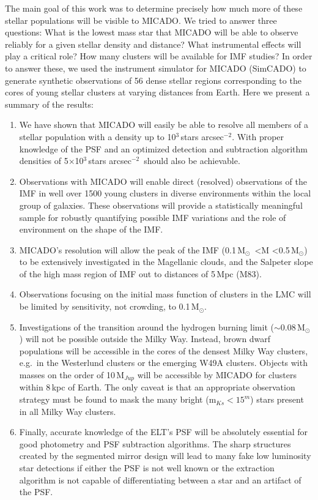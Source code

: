 \documentclass[referee]{aa}
\newcommand{\msun}{M$_\odot$~}
\newcommand{\msune}{M$_\odot$}
\newcommand{\s}{$\sim$}
\newcommand{\h}[1]{$^{#1}$}
\newcommand{\spa}{stars arcsec$^{-2}$~}
\newcommand{\spae}{stars arcsec$^{-2}$}
\begin{document}
The main goal of this work was to determine precisely how much more of these stellar populations will be visible to MICADO. We tried to answer three questions:
What is the lowest mass star that MICADO will be able to observe reliably for a given stellar density and distance?
What instrumental effects will play a critical role?
How many clusters will be available for IMF studies?
In order to answer these, we used the instrument simulator for MICADO (SimCADO) to generate synthetic observations of 56 dense stellar regions corresponding to the cores of young stellar clusters at varying distances from Earth.
Here we present a summary of the results:

\begin{enumerate}
    \item We have shown that MICADO will easily be able to resolve all members of a stellar population with a density up to 10\h3\,\spae.
    With proper knowledge of the PSF and an optimized detection and subtraction algorithm densities of 5$\times$10\h3\,\spa should also be achievable.

    \item Observations with MICADO will enable direct (resolved) observations of the IMF in well over 1500 young clusters in diverse environments within the local group of galaxies.
    These observations will provide a statistically meaningful sample for robustly quantifying possible IMF variations and the role of environment on the shape of the IMF\@.

    \item MICADO's resolution will allow the peak of the IMF (0.1\,\msun\textless M \textless0.5\,\msune) to be extensively investigated in the Magellanic clouds, and the Salpeter slope of the high mass region of IMF out to distances of 5\,Mpc (M83).

    \item Observations focusing on the initial mass function of clusters in the LMC will be limited by sensitivity, not crowding, to 0.1\,\msune.

    \item Investigations of the transition around the hydrogen burning limit (\s0.08\,\msune) will not be possible outside the Milky Way.
    Instead, brown dwarf populations will be accessible in the cores of the densest Milky Way clusters, e.g.\ in the Westerlund clusters or the emerging W49A clusters.
    Objects with masses on the order of 10\,M$_{Jup}$ will be accessible by MICADO for clusters within 8\,kpc of Earth.
    The only caveat is that an appropriate observation strategy must be found to mask the many bright (m$_{Ks}<15^m$) stars present in all Milky Way clusters.

    \item Finally, accurate knowledge of the ELT's PSF will be absolutely essential for good photometry and PSF subtraction algorithms.
    The sharp structures created by the segmented mirror design will lead to many fake low luminosity star detections if either the PSF is not well known or the extraction algorithm is not capable of differentiating between a star and an artifact of the PSF\@.

\end{enumerate}
\end{document}
